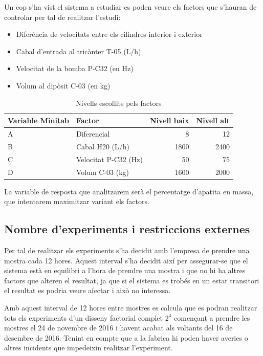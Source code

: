 \documentclass[a4paper]{article}
\begin{document}
Un cop s'ha vist el sistema a estudiar es poden veure els factors que s'hauran de controlar per tal de realitzar l'estudi:

\begin{itemize}
	\item Diferència de velocitats entre els cilindres interior i exterior
	\item Cabal d'entrada al tricànter T-05 (L/h)
	\item Velocitat de la bomba P-C32 (en Hz)
	\item Volum al dipòsit C-03 (en kg)
\end{itemize}

\begin{table}[H]
	\centering
	\begin{tabular}{ l | l | r | r }
		\rowcolor{gray!60}
		Variable Minitab & Factor & Nivell baix & Nivell alt \\ \hline
		A & Diferencial & 8 & 12 \\
		B & Cabal H20 (L/h)& 1800 & 2400 \\
		C & Velocitat P-C32 (Hz) & 50 & 75 \\
		D & Volum C-03 (kg) & 1600 & 2000 \\
	\end{tabular}
	\caption{Nivells escollits pels factors}
\end{table}

La variable de resposta que analitzarem serà el percentatge d'apatita en massa, que intentarem maximitzar variant els factors.


\subsection{Nombre d'experiments i restriccions externes}
Per tal de realitzar els experiments s'ha decidit amb l'empresa de prendre una mostra cada 12 hores. Aquest interval s'ha decidit així per assegurar-se que el sistema està en equilibri a l'hora de prendre una mostra i que no hi ha altres factors que alteren el resultat, ja que si el sistema es trobés en un estat transitori el resultat es podria veure afectar i això no interessa.

Amb aquest interval de 12 hores entre mostres es calcula que es podran realitzar tots els experiments d'un disseny factorial complet $2^4$ començant a prendre les mostres el 24 de novembre de 2016 i havent acabat als voltants del 16 de desembre de 2016. Tenint en compte que a la fabrica hi poden haver averies o altres incidents que impedeixin realitzar l'experiment.
\end{document}
